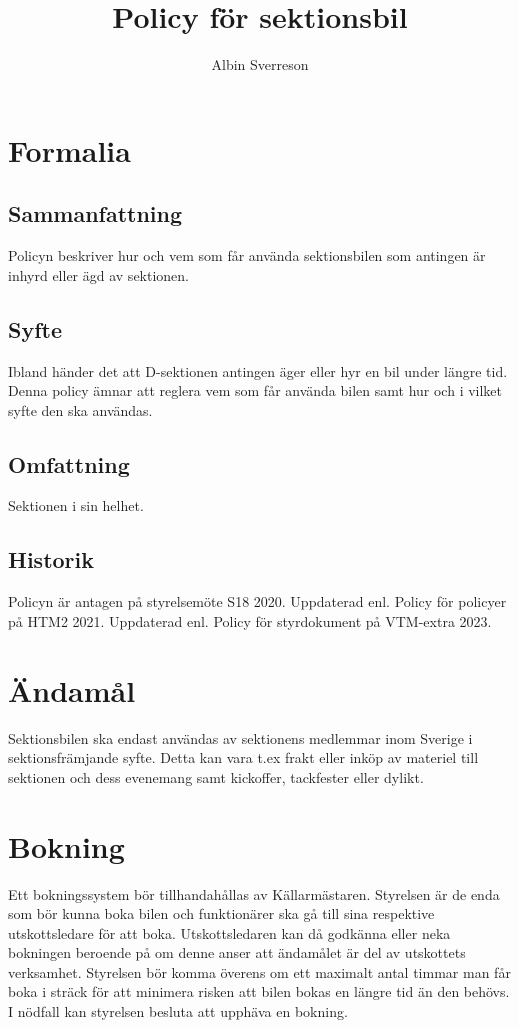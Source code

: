 \documentclass{dsekprotokoll}
\author{Albin Sverreson}
\title{Policy för sektionsbil}
\begin{document}
\maketitle
\section{Formalia}
\subsection{Sammanfattning}
Policyn beskriver hur och vem som får använda sektionsbilen som antingen är inhyrd eller ägd av sektionen.
\subsection{Syfte}
Ibland händer det att D-sektionen antingen äger eller hyr en bil under längre tid. Denna policy ämnar att reglera vem som får använda bilen samt hur och i vilket syfte den ska användas.
\subsection{Omfattning}
Sektionen i sin helhet.
\subsection{Historik}
Policyn är antagen på styrelsemöte S18 2020.
Uppdaterad enl. Policy för policyer på HTM2 2021.
Uppdaterad enl. Policy för styrdokument på VTM-extra 2023.


\section{Ändamål}
Sektionsbilen ska endast användas av sektionens medlemmar inom Sverige i sektionsfrämjande syfte. Detta kan vara t.ex frakt eller inköp av materiel till sektionen och dess evenemang samt kickoffer, tackfester eller dylikt.
\section{Bokning}
Ett bokningssystem bör tillhandahållas av Källarmästaren. Styrelsen är de enda som bör kunna boka bilen och funktionärer ska gå till sina respektive utskottsledare för att boka. Utskottsledaren kan då godkänna eller neka bokningen beroende på om denne anser att ändamålet är del av utskottets verksamhet. Styrelsen bör komma överens om ett maximalt antal timmar man får boka i sträck för att minimera risken att bilen bokas en längre tid än den behövs. I nödfall kan styrelsen besluta att upphäva en bokning.
\end{document}
